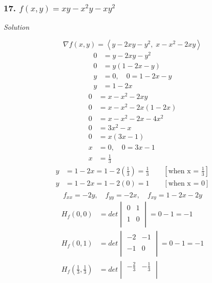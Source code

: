 \documentclass{article}
\newcommand\vv[1]{\left\langle #1 \right\rangle}
\newcommand{\solution}{\centerline{\textit{Solution}}}
\newcommand{\bp}[1]{\left(#1\right)}
\newcommand{\bb}[1]{\left[#1\right]}
\newcommand{\also}{,\quad}
\begin{document}
{\subsubsection*{17. $f(x,y)=xy-x^2y-xy^2$}
\solution 
\vspace{1em}
\[
    \nabla f(x,y) = \vv{y-2xy-y^2,\;x-x^2-2xy}
\]
\begin{align*}
    0 &= y-2xy-y^2 \\
    0 &= y(1-2x-y) \\
    y &= 0 \also 0 = 1-2x-y \\
    y &= 1 - 2x
\end{align*}
\begin{align*}
    0 &= x-x^2-2xy \\
    0 &= x-x^2-2x(1-2x) \\
    0 &= x-x^2-2x-4x^2 \\
    0 &= 3x^2 - x \\
    0 &= x(3x - 1) \\
    x &= 0 \also 0 = 3x - 1 \\
    x &= \frac 1 3
\end{align*}
\begin{align*}
    y &= 1 - 2x = 1 - 2\bp{\frac 1 3} = \frac 1 3\qquad \bb{\text{when x = $\frac 1
    3$}} \\
    y &= 1 - 2x = 1 - 2\bp{0} = 1 \qquad \bb{\text{when x = 0}}\\
\end{align*}
\[
    f_{xx}=-2y\also f_{yy}=-2x\also f_{xy}=1-2x - 2y
\]
\begin{align*}
    H_f(0, 0) &= det\begin{vmatrix}
    0 & 1 \\\\
    1 & 0 \\
\end{vmatrix} = 0 - 1 = -1 \\
    H_f(0, 1) &= det\begin{vmatrix}
    -2 & -1 \\\\
    -1 & 0 \\
\end{vmatrix} = 0 - 1 = -1 \\
    H_f\bp{\frac 1 3, \frac 1 3} &= det\begin{vmatrix}
    -\frac 2 3  & -\frac 1 3 \\\\

\end{vmatrix}
\end{align*}}
\end{document}
